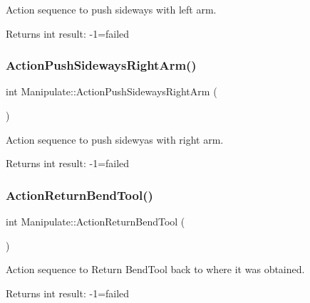 Action sequence to push sideways with left arm. 

\begin{DoxyReturn}{Returns}
int result\+: -\/1=failed 
\end{DoxyReturn}
\mbox{\label{structManipulate_a5a401d36a7b32fb608c0d432091fc3dc}} 
\subsubsection{\texorpdfstring{Action\+Push\+Sideways\+Right\+Arm()}{ActionPushSidewaysRightArm()}}
{\footnotesize\ttfamily int Manipulate\+::\+Action\+Push\+Sideways\+Right\+Arm (\begin{DoxyParamCaption}{ }\end{DoxyParamCaption})\hspace{0.3cm}{\ttfamily [private]}}



Action sequence to push sidewyas with right arm. 

\begin{DoxyReturn}{Returns}
int result\+: -\/1=failed 
\end{DoxyReturn}
\mbox{\label{structManipulate_a2a2cd9af2803118298b33008c27a295d}} 
\subsubsection{\texorpdfstring{Action\+Return\+Bend\+Tool()}{ActionReturnBendTool()}}
{\footnotesize\ttfamily int Manipulate\+::\+Action\+Return\+Bend\+Tool (\begin{DoxyParamCaption}{ }\end{DoxyParamCaption})\hspace{0.3cm}{\ttfamily [private]}}



Action sequence to Return Bend\+Tool back to where it was obtained. 

\begin{DoxyReturn}{Returns}
int result\+: -\/1=failed 
\end{DoxyReturn}
\mbox{\label{structManipulate_a0bd90bbdd4f24ba6740da3e789210982}} 
